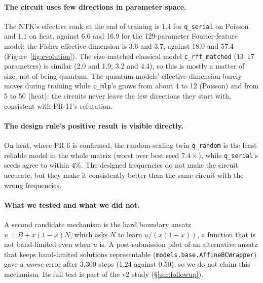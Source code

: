 \paragraph{The circuit uses few directions in parameter space.} The NTK's effective rank
at the end of training is 1.4 for \texttt{q\_serial} on Poisson and 1.1 on heat, against
6.6 and 16.9 for the 129-parameter Fourier-feature model; the Fisher effective dimension
is 3.6 and 3.7, against 18.0 and 57.4 (Figure~\ref{fig:evolution}). The size-matched
classical model \texttt{c\_rff\_matched} (13--17 parameters) is similar (2.0 and 1.9;
3.2 and 4.4), so this is mostly a matter of size, not of being quantum. The quantum
models' effective dimension barely moves during training while \texttt{c\_mlp}'s grows
from about 4 to 12 (Poisson) and from 5 to 50 (heat): the circuits never leave the few
directions they start with, consistent with PR-11's refutation.

\paragraph{The design rule's positive result is visible directly.} On heat, where
PR-6 is confirmed, the random-scaling twin \texttt{q\_random} is the least reliable
model in the whole matrix (worst over best seed $7.4\times$), while \texttt{q\_serial}'s
seeds agree to within 4\%. The designed frequencies do not make the circuit accurate,
but they make it consistently better than the same circuit with the wrong frequencies.

\paragraph{What we tested and what we did not.} A second candidate mechanism is the
hard boundary ansatz $u=B+x(1-x)N$, which asks $N$ to learn $u/(x(1-x))$, a function
that is not band-limited even when $u$ is. A post-submission pilot of an alternative
ansatz that keeps band-limited solutions representable
(\texttt{models.base.AffineBCWrapper}) gave a \emph{worse} error after 3{,}300 steps
(1.24 against 0.50), so we do not claim this mechanism. Its full test is part of the
v2 study (\S\ref{sec:followup}).
